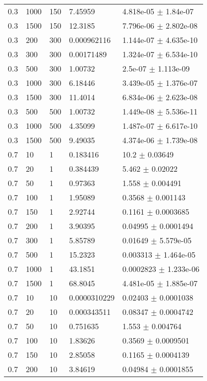 \begin{longtable}{lllll}
 0.3 &  1000 &   150 &  7.45959 & 4.818e-05 $\pm$ 1.84e-07 \\
 0.3 &  1500 &   150 &  12.3185 & 7.796e-06 $\pm$ 2.802e-08 \\
 0.3 &   200 &   300 & 0.000962116 & 1.144e-07 $\pm$ 4.635e-10 \\
 0.3 &   300 &   300 & 0.00171489 & 1.324e-07 $\pm$ 6.534e-10 \\
 0.3 &   500 &   300 &  1.00732 &  2.5e-07 $\pm$ 1.113e-09 \\
 0.3 &  1000 &   300 &  6.18446 & 3.439e-05 $\pm$ 1.376e-07 \\
 0.3 &  1500 &   300 &  11.4014 & 6.834e-06 $\pm$ 2.623e-08 \\
 0.3 &   500 &   500 &  1.00732 & 1.449e-08 $\pm$ 5.536e-11 \\
 0.3 &  1000 &   500 &  4.35099 & 1.487e-07 $\pm$ 6.617e-10 \\
 0.3 &  1500 &   500 &  9.49035 & 4.374e-06 $\pm$ 1.739e-08 \\
 0.7 &    10 &     1 & 0.183416 &     10.2 $\pm$  0.03649 \\
 0.7 &    20 &     1 & 0.384439 &    5.462 $\pm$  0.02022 \\
 0.7 &    50 &     1 &  0.97363 &    1.558 $\pm$ 0.004491 \\
 0.7 &   100 &     1 &  1.95089 &   0.3568 $\pm$ 0.001143 \\
 0.7 &   150 &     1 &  2.92744 &   0.1161 $\pm$ 0.0003685 \\
 0.7 &   200 &     1 &  3.90395 &  0.04995 $\pm$ 0.0001494 \\
 0.7 &   300 &     1 &  5.85789 &  0.01649 $\pm$ 5.579e-05 \\
 0.7 &   500 &     1 &  15.2323 & 0.003313 $\pm$ 1.464e-05 \\
 0.7 &  1000 &     1 &  43.1851 & 0.0002823 $\pm$ 1.233e-06 \\
 0.7 &  1500 &     1 &  68.8045 & 4.481e-05 $\pm$ 1.885e-07 \\
 0.7 &    10 &    10 & 0.0000310229 &  0.02403 $\pm$ 0.0001038 \\
 0.7 &    20 &    10 & 0.000343511 &  0.08347 $\pm$ 0.0004742 \\
 0.7 &    50 &    10 & 0.751635 &    1.553 $\pm$ 0.004764 \\
 0.7 &   100 &    10 &  1.83626 &   0.3569 $\pm$ 0.0009501 \\
 0.7 &   150 &    10 &  2.85058 &   0.1165 $\pm$ 0.0004139 \\
 0.7 &   200 &    10 &  3.84619 &  0.04984 $\pm$ 0.0001855 \\

\end{longtable}
